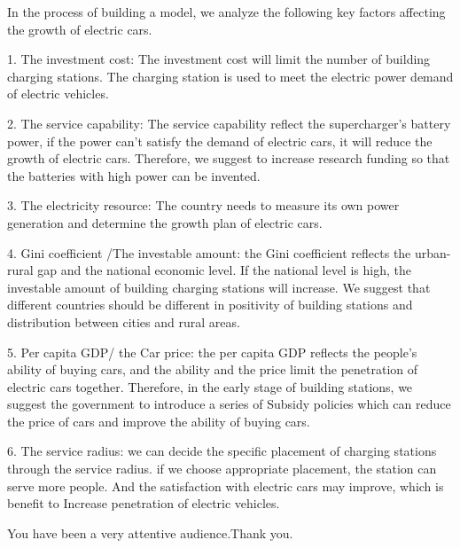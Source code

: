 \documentclass{mcmthesis}
\begin{document}
\par In the process of building a model, we analyze the following key factors affecting the growth of electric cars.

\par 1. The investment cost: The investment cost will limit the number of building charging stations. The charging station is used to meet the electric power demand of electric vehicles.
\par 2. The service capability: The service capability reflect the supercharger's battery power, if the power can't satisfy the demand of electric cars, it will reduce the growth of electric cars. Therefore, we suggest to increase research funding so that the batteries with high power can be invented. 
\par 3. The electricity resource: The country needs to measure its own power generation and determine the growth plan of electric cars.
\par 4. Gini coefficient /The investable amount: the Gini coefficient reflects the urban-rural gap and the national economic level. If the national level is high, the investable amount of building charging stations will increase. We suggest that different countries should be different in positivity of building stations and distribution between cities and rural areas.
\par 5. Per capita GDP/ the Car price: the per capita GDP reflects the people's ability of buying cars, and the ability and the price limit the penetration of electric cars together. Therefore, in the early stage of building stations, we suggest the government to introduce a series of Subsidy policies which can reduce the price of cars and improve the ability of buying cars.
\par 6. The service radius: we can decide the specific placement of charging stations through the service radius. if we choose appropriate placement, the station can serve more people. And the satisfaction with electric cars may improve, which is benefit to Increase penetration of electric vehicles.

You have been a very attentive audience.Thank you.
\end{document}
